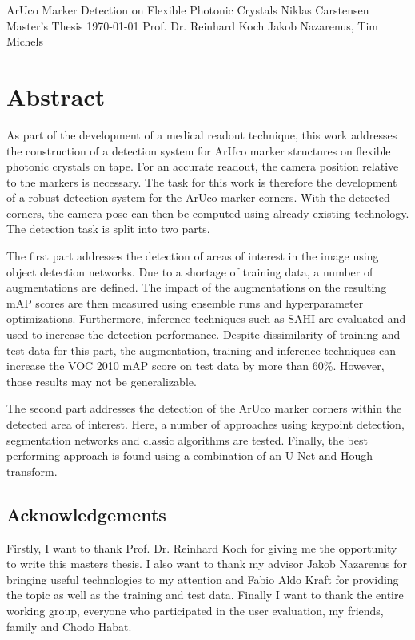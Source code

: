 \documentclass[10pt]{book}
\newcommand*\NewPage{\newpage\null\thispagestyle{empty}\newpage}
\begin{document}
\frontmatter

\studtitlepage%
{ArUco Marker Detection on Flexible Photonic Crystals}%
{}
{Niklas Carstensen}%
{Master's Thesis}%
{\today}%
{Prof. Dr. Reinhard Koch}%
{Jakob Nazarenus, Tim Michels}%
\NewPage{}
\setcounter{page}{2}
\studeidesstatt
\NewPage{}

\setcounter{page}{3}
\chapter*{Abstract}

As part of the development of a medical readout technique, this work addresses the construction of a detection system for \ac{ArUco} marker structures on flexible photonic crystals on tape. For an accurate readout, the camera position relative to the markers is necessary. The task for this work is therefore the development of a robust detection system for the \ac{ArUco} marker corners. With the detected corners, the camera pose can then be computed using already existing technology. The detection task is split into two parts. 

The first part addresses the detection of areas of interest in the image using object detection networks. Due to a shortage of training data, a number of augmentations are defined. 
The impact of the augmentations on the resulting \ac{mAP} scores are then measured using ensemble runs and hyperparameter optimizations. Furthermore, inference techniques such as \ac{SAHI} are evaluated and used to increase the detection performance. Despite dissimilarity of training and test data for this part, the augmentation, training and inference techniques can increase the VOC 2010 \ac{mAP} score on test data by more than 60\%. However, those results may not be generalizable.

The second part addresses the detection of the \ac{ArUco} marker corners within the detected area of interest. Here, a number of approaches using keypoint detection, segmentation networks and classic algorithms are tested. Finally, the best performing approach is found using a combination of an U-Net and Hough transform.

\newpage
\section*{Acknowledgements}
Firstly, I want to thank Prof. Dr. Reinhard Koch for giving me the opportunity to write this masters thesis. I also want to thank my advisor Jakob Nazarenus for bringing useful technologies to my attention and Fabio Aldo Kraft for providing the topic as well as the training and test data. Finally I want to thank the entire working group, everyone who participated in the user evaluation, my friends, family and Chodo Habat.
\end{document}
